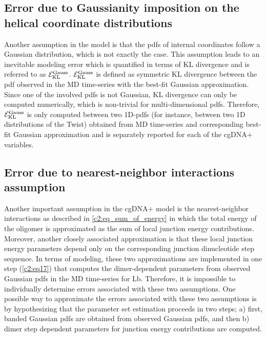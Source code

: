 \subsection{Error due to Gaussianity imposition on the helical coordinate distributions}\label{c2:s5sb22}
Another assumption in the model is that the pdfs of internal coordinates follow a Gaussian distribution, which is not exactly the case.
This assumption leads to an inevitable modeling error which is quantified in terms of KL divergence and is referred to as ${\mathcal E}_{\text{KL}}^{\text{Gauss}}$.
${\mathcal E}_{\text{KL}}^{\text{Gauss}}$ is defined as symmetric KL divergence between the pdf observed in the MD time-series with the best-fit Gaussian approximation.
Since one of the involved pdfs is not Gaussian, KL divergence can only be computed numerically, which is non-trivial for multi-dimensional pdfs. 
Therefore, ${\mathcal E}_{\text{KL}}^{\text{Gauss}}$ is only computed between two 1D-pdfs (for instance, between two 1D distributions of the Twist) obtained from MD time-series and corresponding best-fit Gaussian approximation and is separately reported for each of the cgDNA$+$ variables.
\subsection{Error due to nearest-neighbor interactions assumption}\label{c2:s5sb2} 
Another important assumption in the cgDNA$+$ model is the nearest-neighbor interactions as described in   \cref{c2:eq_sum_of_energy} in which the total energy of the oligomer is approximated as the sum of local junction energy contributions. 
Moreover, another closely associated approximation is that these local junction energy parameters depend only on the corresponding junction dinucleotide step sequence.
In terms of modeling, these two approximations are implemented in one step (\cref{c2:eq17}) that computes the dimer-dependent parameters from observed Gaussian pdfs in the MD time-series for Lb.
Therefore, it is impossible to individually determine errors associated with these two assumptions.
One possible way to approximate the errors associated with these two assumptions is by hypothesizing that the parameter set estimation proceeds in two steps; a) first, banded Gaussian pdfs are obtained from observed Gaussian pdfs, and then b) dimer step dependent parameters for junction energy contributions are computed.


